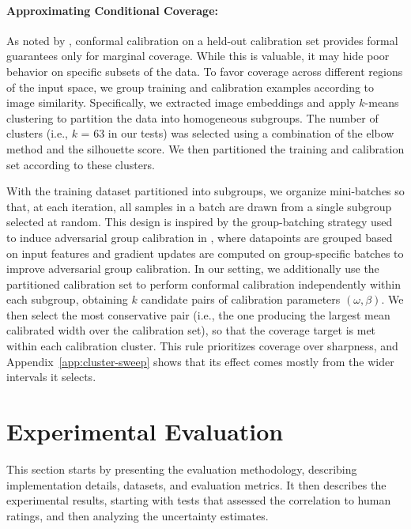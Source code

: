 \documentclass[11pt]{article}
\begin{document}
\paragraph{Approximating Conditional Coverage:} As noted by \citet{angelopoulos2021gentle}, conformal calibration on a held-out calibration set provides formal guarantees only for marginal coverage. While this is valuable, it may hide poor behavior on specific subsets of the data. To favor coverage across different regions of the input space, we group training and calibration examples according to image similarity. Specifically, we extracted image embeddings and apply \(k\)-means clustering to partition the data into homogeneous subgroups. The number of clusters (i.e., $k$ = 63 in our tests) was selected using a combination of the elbow method and the silhouette score. We then partitioned the training and calibration set according to these clusters.

With the training dataset partitioned into subgroups, we organize mini-batches so that, at each iteration, all samples in a batch are drawn from a single subgroup selected at random. This design is inspired by the group-batching strategy used to induce adversarial group calibration in \citet{chung2021beyond}, where datapoints are grouped based on input features and gradient updates are computed on group-specific batches to improve adversarial group calibration. In our setting, we additionally use the partitioned calibration set to perform conformal calibration independently within each subgroup, obtaining $k$ candidate pairs of calibration parameters $(\omega, \beta)$. We then select the most conservative pair (i.e., the one producing the largest mean calibrated width over the calibration set), so that the coverage target is met within each calibration cluster. This rule prioritizes coverage over sharpness, and Appendix~\ref{app:cluster-sweep} shows that its effect comes mostly from the wider intervals it selects.

\vspace{-0.13cm}
\section{Experimental Evaluation}
\vspace{-0.13cm}

This section starts by presenting the evaluation methodology, describing implementation details, datasets, and evaluation metrics. It then describes the experimental results, starting with tests that assessed the correlation to human ratings, and then analyzing the uncertainty estimates. 
\end{document}

